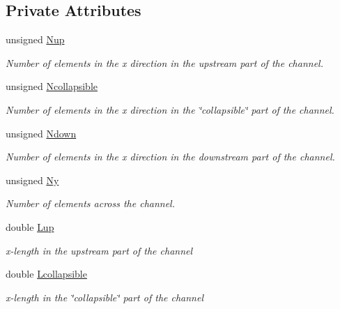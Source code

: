 \subsection*{Private Attributes}
\begin{DoxyCompactItemize}
\item 
unsigned \hyperlink{classCollapsibleChannelProblem_a512e07ac795b19bfed9f82fd7927e8f9}{Nup}
\begin{DoxyCompactList}\small\item\em Number of elements in the x direction in the upstream part of the channel. \end{DoxyCompactList}\item 
unsigned \hyperlink{classCollapsibleChannelProblem_a941d6703a949d3a2f73b24080ca34bab}{Ncollapsible}
\begin{DoxyCompactList}\small\item\em Number of elements in the x direction in the \char`\"{}collapsible\char`\"{} part of the channel. \end{DoxyCompactList}\item 
unsigned \hyperlink{classCollapsibleChannelProblem_ac3991835635f02f895ea35adc7d985dc}{Ndown}
\begin{DoxyCompactList}\small\item\em Number of elements in the x direction in the downstream part of the channel. \end{DoxyCompactList}\item 
unsigned \hyperlink{classCollapsibleChannelProblem_aca26ffb5de27680b8eb2195f05c8ff7d}{Ny}
\begin{DoxyCompactList}\small\item\em Number of elements across the channel. \end{DoxyCompactList}\item 
double \hyperlink{classCollapsibleChannelProblem_a56353f52e7cf1564ffe77373ead3c2d0}{Lup}
\begin{DoxyCompactList}\small\item\em x-\/length in the upstream part of the channel \end{DoxyCompactList}\item 
double \hyperlink{classCollapsibleChannelProblem_a4edf74f18e84c3a2170428322d9e6824}{Lcollapsible}
\begin{DoxyCompactList}\small\item\em x-\/length in the \char`\"{}collapsible\char`\"{} part of the channel \end{DoxyCompactList}\item 

\end{DoxyCompactItemize}
